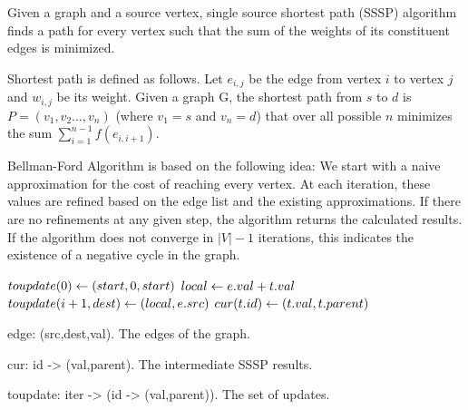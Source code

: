 Given a graph and a source vertex, single source shortest path (SSSP) algorithm finds a path for every vertex such that the sum of the weights of its constituent edges is minimized.

Shortest path is defined as follows. Let $e_{i,j}$ be the edge from vertex $i$ to vertex $j$ and $w_{i,j}$ be its weight. Given a graph G, the shortest path from $s$ to $d$ is $P = (v_1, v_2 \dots, v_n)$ (where $v_1=s$ and $v_n=d$) that over all possible $n$ minimizes the sum $ \sum _{i=1}^{n-1}f(e_{i,i+1})$.


Bellman-Ford Algorithm \cite{bellman1958routing,ford1956network} is based on the following idea: We start with a naive approximation for the cost of reaching every vertex. At each iteration, these values are refined based on the edge list and the existing approximations. If there are no refinements at any given step, the algorithm returns the calculated results. If the algorithm does not converge in $|V|-1$ iterations, this indicates the existence of a negative cycle in the graph.


\begin{algorithm} \label{alg:sssp}
\begin{algorithmic}[1]
	\State $toupdate(0) \leftarrow (start,0,start)$
		 \label{alg:sssp:update}
		 		\State $local \leftarrow e.val + t.val$
		 		 \label{alg:sssp:single}
		 			\State $toupdate(i+1,dest) \leftarrow (local,e.src)$
		 		\EndIf
			\EndFor
		\EndFor
		 		\State $cur(t.id) \leftarrow (t.val,t.parent)$
		 	\EndIf
		\EndFor
	\EndFor
\end{algorithmic}
\end{algorithm}

\begin{description}
\item edge: (src,dest,val). The edges of the graph.
\item cur: id -> (val,parent). The intermediate SSSP results.
\item toupdate: iter -> (id -> (val,parent)). The set of updates.
\end{description}

